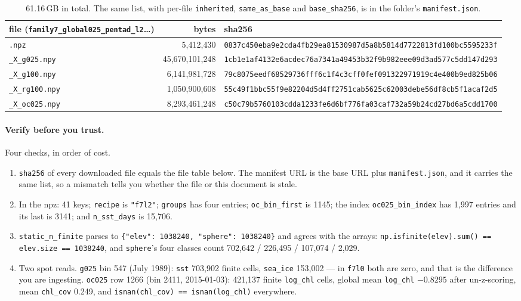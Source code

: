 \documentclass[10pt]{article}
\newcommand{\code}[1]{\texttt{#1}}
\begin{document}
\begin{table}[h]
\centering\setlength{\tabcolsep}{4pt}\footnotesize
\begin{tabular}{@{}lr>{\raggedright\arraybackslash}p{6.0cm}@{}}
\toprule
file (\code{family7\_global025\_pentad\_l2}\dots) & bytes & sha256 \\
\midrule
\code{.npz} & 5,412,430 & \code{0837c450eba9e2cda4fb29ea81530987}\allowbreak\code{d5a8b5814d7722813fd100bc5595233f} \\
\code{\_X\_g025.npy} & 45,670,101,248 & \code{1cb1e1af4132e6acdec76a7341a49453}\allowbreak\code{b32f9b982eee09d3ad577c5dd147d293} \\
\code{\_X\_g100.npy} & 6,141,981,728 & \code{79c8075eedf68529736fff6c1f4c3cff}\allowbreak\code{0fef091322971919c4e400b9ed825b06} \\
\code{\_X\_rg100.npy} & 1,050,900,608 & \code{55c49f1bbc55f9e82204d5d4ff2751ca}\allowbreak\code{b5625c62003debe56df8cb5f1acaf2d5} \\
\code{\_X\_oc025.npy} & 8,293,461,248 & \code{c50c79b5760103cdda1233fe6d6bf776}\allowbreak\code{fa03caf732a59b24cd27bd6a5cdd1700} \\
\bottomrule
\end{tabular}
\caption{61.16\,GB in total. The same list, with per-file \code{inherited},
\code{same\_as\_base} and \code{base\_sha256}, is in the folder's
\code{manifest.json}.}
\end{table}

\paragraph{Verify before you trust.} Four checks, in order of cost.
\begin{enumerate}\itemsep1pt
\item \code{sha256} of every downloaded file equals the file table below. The
manifest URL is the base URL plus \code{manifest.json}, and it carries the
same list, so a mismatch tells you whether the file or this document is stale.
\item In the npz: 41 keys; \code{recipe} is \code{"f7l2"}; \code{groups} has
four entries; \code{oc\_bin\_first} is 1145; the index
\code{oc025\_bin\_index} has 1,997 entries and its last is 3141; and
\code{n\_sst\_days} is 15,706.
\item \code{static\_n\_finite} parses to
\code{\{"elev": 1038240, "sphere": 1038240\}} and agrees with the arrays:
\code{np.isfinite(elev).sum() == elev.size == 1038240}, and \code{sphere}'s
four classes count 702,642 / 226,495 / 107,074 / 2,029.
\item Two spot reads. \code{g025} bin 547 (July 1989): \code{sst} 703,902
finite cells, \code{sea\_ice} 153,002 --- in \code{f7l0} both are zero, and
that is the difference you are ingesting. \code{oc025} row 1266 (bin 2411,
2015-01-03): 421,137 finite \code{log\_chl} cells, global mean \code{log\_chl}
$-0.8295$ after un-z-scoring, mean \code{chl\_cov} 0.249, and
\code{isnan(chl\_cov) == isnan(log\_chl)} everywhere.
\end{enumerate}
\end{document}
